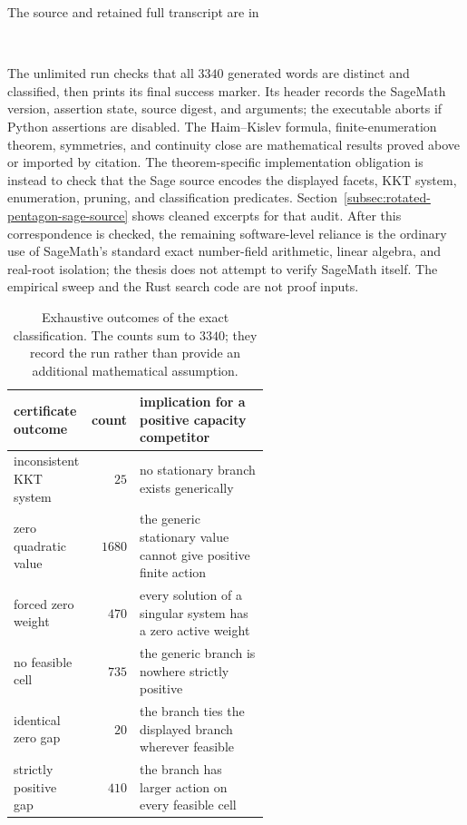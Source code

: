 The source and retained full transcript are in
\begin{center}
  \small{}\\[-0.2em]
\end{center}
The unlimited run checks that all \(3340\) generated words are distinct and
classified, then prints its final success marker.  Its header
records the SageMath version, assertion state, source digest, and arguments;
the executable aborts if Python assertions are disabled.  The Haim--Kislev
formula, finite-enumeration theorem, symmetries, and continuity close are
mathematical results proved above or imported by citation.  The
theorem-specific implementation obligation is instead to check that the Sage
source encodes the displayed facets, KKT system, enumeration, pruning, and
classification predicates.  Section~\ref{subsec:rotated-pentagon-sage-source}
shows cleaned excerpts for that audit.  After this correspondence is checked,
the remaining software-level reliance is the ordinary use of SageMath's
standard exact number-field arithmetic, linear algebra, and real-root
isolation; the thesis does not attempt to verify SageMath itself.  The
empirical sweep and the Rust search code are not proof inputs.

\begin{table}[h!]
\centering
\small
\begin{tabular}{@{}lrp{0.56\linewidth}@{}}
\toprule
certificate outcome & count & implication for a positive capacity competitor\\
\midrule
inconsistent KKT system & \(25\) & no stationary branch exists generically\\
zero quadratic value & \(1680\) & the generic stationary value cannot give positive finite action\\
forced zero weight & \(470\) & every solution of a singular system has a zero active weight\\
no feasible cell & \(735\) & the generic branch is nowhere strictly positive\\
identical zero gap & \(20\) & the branch ties the displayed branch wherever feasible\\
strictly positive gap & \(410\) & the branch has larger action on every feasible cell\\
\bottomrule
\end{tabular}
\caption{Exhaustive outcomes of the exact classification.  The counts sum to
\(3340\); they record the run rather than provide an additional mathematical
assumption.}
\label{tab:rotated-pentagon-certificate-outcomes}
\end{table}
\FloatBarrier

